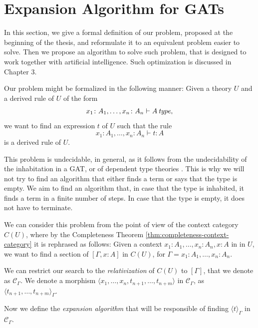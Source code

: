 \section{Expansion Algorithm for GATs}

In this section, we give a formal definition of our 
problem, proposed at the beginning of the thesis,
and reformulate it to an equivalent problem easier to solve.
Then we propose an algorithm to solve such problem,
that is designed to work together with artificial intelligence.
Such optimization is discussed in Chapter 3.

Our problem might be formalized in the following manner:
Given a theory $U$ and a derived rule of $U$ of the form 
\[
    x_1 \colon A_1, \dots, x_n \colon A_n \vdash A \operatorname{\mathit{\space type}},
\]
we want to find an expression $t$ of $U$ such that the rule 
\[
    x_1 \colon A_1, \dots, x_n \colon A_n \vdash t \colon A
\]
is a derived rule of $U$.

This problem is undecidable, in general, as it follows from the undecidability
of the inhabitation in a GAT, or of dependent type theories \cite{dowek1993}. This is why we will not try to find
an algorithm that either finds a term or says that the type is empty.
We aim to find an algorithm that, in case that the type is 
inhabited, it finds a term in a finite number of steps.
In case that the type is empty, it does not have to terminate.

We can consider this problem from the point of view of the 
context category $C(U)$, where by the Completeness Theorem \ref{thm:completeness-context-category}
it is rephrased as follows:
Given a context $x_1 \colon A_1, \dots, x_n \colon A_n, x \colon A$
in in $U$, we want to find a section of $[\Gamma, x \colon A]$
in $C(U)$, for $\Gamma = x_1 \colon A_1, \dots, x_n \colon A_n$.

We can restrict our search to the \textit{relativization} of $C(U)$ to $[\Gamma]$,
that we denote as $\mathcal{C}_\Gamma$.
We denote a morphism $\langle x_1, \dots, x_n, t_{n+1}, \dots, t_{n+m} \rangle$  in $\mathcal{C}_\Gamma$,
as $\langle t_{n+1}, \dots, t_{n+m} \rangle_\Gamma$.

Now we define the \textit{expansion algorithm}
that will be responsible of finding $\langle t \rangle_\Gamma$
in $\mathcal{C}_\Gamma$.

